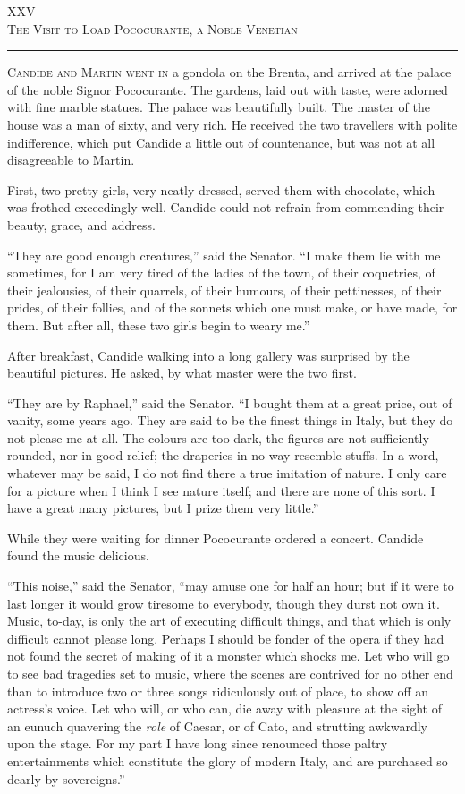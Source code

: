 \begin{center}
XXV\\
\textsc{The Visit to Load Pococurante, a Noble Venetian}
\end{center}
\vspace{-0.5cm}
\rule{\textwidth}{0.5pt}
\lettrine{C}{andide and Martin went in} a gondola on the Brenta, and arrived at the palace of the noble Signor Pococurante. The gardens, laid out with taste, were adorned with fine marble statues. The palace was beautifully built. The master of the house was a man of sixty, and very rich. He received the two travellers with polite indifference, which put Candide a little out of countenance, but was not at all disagreeable to Martin.

First, two pretty girls, very neatly dressed, served them with chocolate, which was frothed exceedingly well. Candide could not refrain from commending their beauty, grace, and address.

``They are good enough creatures,'' said the Senator. ``I make them lie with me sometimes, for I am very tired of the ladies of the town, of their coquetries, of their jealousies, of their quarrels, of their humours, of their pettinesses, of their prides, of their follies, and of the sonnets which one must make, or have made, for them. But after all, these two girls begin to weary me.''

After breakfast, Candide walking into a long gallery was surprised by the beautiful pictures. He asked, by what master were the two first.

``They are by Raphael,'' said the Senator. ``I bought them at a great price, out of vanity, some years ago. They are said to be the finest things in Italy, but they do not please me at all. The colours are too dark, the figures are not sufficiently rounded, nor in good relief; the draperies in no way resemble stuffs. In a word, whatever may be said, I do not find there a true imitation of nature. I only care for a picture when I think I see nature itself; and there are none of this sort. I have a great many pictures, but I prize them very little.''

While they were waiting for dinner Pococurante ordered a concert. Candide found the music delicious.

``This noise,'' said the Senator, ``may amuse one for half an hour; but if it were to last longer it would grow tiresome to everybody, though they durst not own it. Music, to-day, is only the art of executing difficult things, and that which is only difficult cannot please long. Perhaps I should be fonder of the opera if they had not found the secret of making of it a monster which shocks me. Let who will go to see bad tragedies set to music, where the scenes are contrived for no other end than to introduce two or three songs ridiculously out of place, to show off an actress's voice. Let who will, or who can, die away with pleasure at the sight of an eunuch quavering the \textit{role} of Caesar, or of Cato, and strutting awkwardly upon the stage. For my part I have long since renounced those paltry entertainments which constitute the glory of modern Italy, and are purchased so dearly by sovereigns.''

